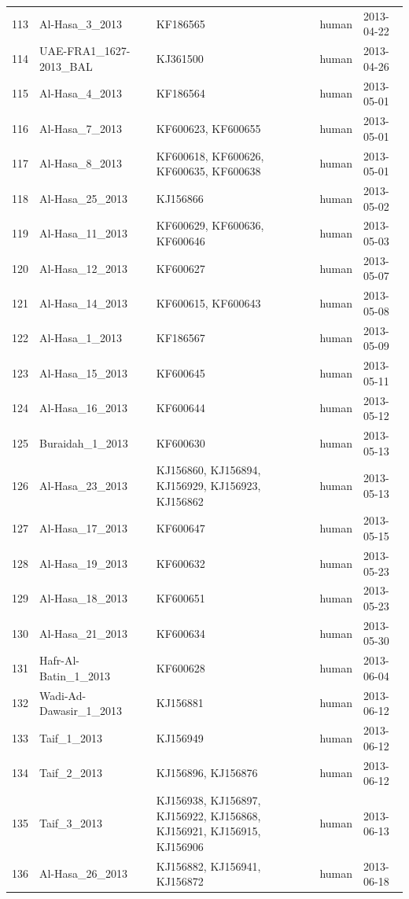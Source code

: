 \documentclass[11pt,oneside,letterpaper]{article}
\begin{document}
\begin{longtable}{ | r | l | p{2cm} | l | l | }
  113 & Al-Hasa\_3\_2013 & KF186565 & human & 2013-04-22 \\
  114 & UAE-FRA1\_1627-2013\_BAL & KJ361500 & human & 2013-04-26 \\
  115 & Al-Hasa\_4\_2013 & KF186564 & human & 2013-05-01 \\
  116 & Al-Hasa\_7\_2013 & KF600623, KF600655 & human & 2013-05-01 \\
  117 & Al-Hasa\_8\_2013 & KF600618, KF600626, KF600635, KF600638 & human & 2013-05-01 \\
  118 & Al-Hasa\_25\_2013 & KJ156866 & human & 2013-05-02 \\
  119 & Al-Hasa\_11\_2013 & KF600629, KF600636, KF600646 & human & 2013-05-03 \\
  120 & Al-Hasa\_12\_2013 & KF600627 & human & 2013-05-07 \\
  121 & Al-Hasa\_14\_2013 & KF600615, KF600643 & human & 2013-05-08 \\
  122 & Al-Hasa\_1\_2013 & KF186567 & human & 2013-05-09 \\
  123 & Al-Hasa\_15\_2013 & KF600645 & human & 2013-05-11 \\
  124 & Al-Hasa\_16\_2013 & KF600644 & human & 2013-05-12 \\
  125 & Buraidah\_1\_2013 & KF600630 & human & 2013-05-13 \\
  126 & Al-Hasa\_23\_2013 & KJ156860, KJ156894, KJ156929, KJ156923, KJ156862 & human & 2013-05-13 \\
  127 & Al-Hasa\_17\_2013 & KF600647 & human & 2013-05-15 \\
  128 & Al-Hasa\_19\_2013 & KF600632 & human & 2013-05-23 \\
  129 & Al-Hasa\_18\_2013 & KF600651 & human & 2013-05-23 \\
  130 & Al-Hasa\_21\_2013 & KF600634 & human & 2013-05-30 \\
  131 & Hafr-Al-Batin\_1\_2013 & KF600628 & human & 2013-06-04 \\
  132 & Wadi-Ad-Dawasir\_1\_2013 & KJ156881 & human & 2013-06-12 \\
  133 & Taif\_1\_2013 & KJ156949 & human & 2013-06-12 \\
  134 & Taif\_2\_2013 & KJ156896, KJ156876 & human & 2013-06-12 \\
  135 & Taif\_3\_2013 & KJ156938, KJ156897, KJ156922, KJ156868, KJ156921, KJ156915,
KJ156906 & human & 2013-06-13 \\
  136 & Al-Hasa\_26\_2013 & KJ156882, KJ156941, KJ156872 & human & 2013-06-18 \\

\end{longtable}
\end{document}
